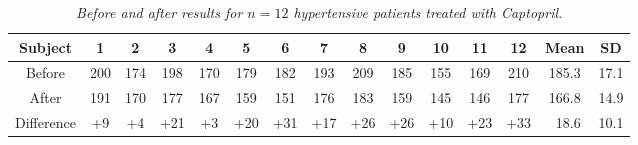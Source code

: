 \documentclass[12pt]{article}
\begin{document}
\begin{table}[t!]

\small

\begin{center}

\begin{tabular}{c|cccccccccccc|cc}

Subject & 1 & 2 & 3 & 4 & 5 & 6 & 7 & 8 & 9 & 10 & 11 & 12 & Mean & SD \\

\hline

Before & 200 & 174 & 198 & 170 & 179 & 182 & 193 & 209 & 185 & 155 & 169
& 210 & 185.3 & 17.1 \\

After & 191 & 170 & 177 & 167 & 159 & 151 & 176 & 183 & 159 & 145 & 146 &
177 & 166.8 & 14.9 \\

\hline

Difference & +9 & +4 & +21 & +3 & +20 & +31 & +17 & +26 & +26 & +10 & +23
& +33 & \ 18.6 & 10.1

\end{tabular}

\caption{\textit{Before and after results for $n = 12$ hypertensive patients
treated with Captopril.}}

\end{center}

\normalsize

\vspace*{-0.35in}

\end{table}
\end{document}
